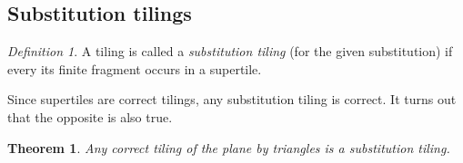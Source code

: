 \documentclass[11pt]{article}
\newtheorem{theorem}{Theorem}
\theoremstyle{remark}
\newtheorem{definition}{Definition}
\begin{document}
\subsection{Substitution tilings}

\begin{definition}
  A tiling is called a \emph{substitution tiling} (for the given substitution) if every its finite fragment
  occurs in a supertile.
\end{definition}

Since supertiles are correct tilings, any substitution tiling is correct. It turns out that the opposite is also true.

\begin{theorem}\label{th4}
Any correct tiling of the plane by triangles is a substitution tiling.
\end{theorem}
\end{document}
